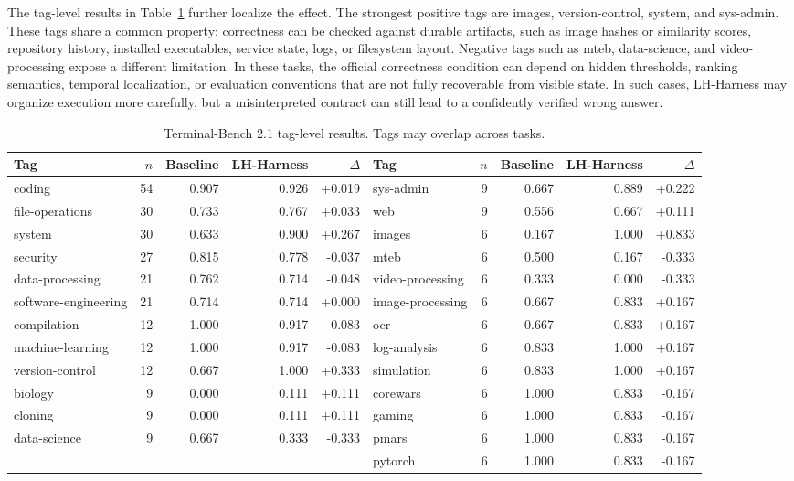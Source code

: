 The tag-level results in Table~\ref{tab:terminalbench-tag-breakdown} further localize the effect. The strongest positive tags are images, version-control, system, and sys-admin. These tags share a common property: correctness can be checked against durable artifacts, such as image hashes or similarity scores, repository history, installed executables, service state, logs, or filesystem layout. Negative tags such as mteb, data-science, and video-processing expose a different limitation. In these tasks, the official correctness condition can depend on hidden thresholds, ranking semantics, temporal localization, or evaluation conventions that are not fully recoverable from visible state. In such cases, LH-Harness may organize execution more carefully, but a misinterpreted contract can still lead to a confidently verified wrong answer.

\begin{table}[t]
\caption{Terminal-Bench 2.1 tag-level results. Tags may overlap across tasks.}
\label{tab:terminalbench-tag-breakdown}
\centering
\scriptsize
\setlength{\tabcolsep}{4pt}
\begin{tabular}{lrrrr@{\hspace{1.1em}}lrrrr}
\toprule
Tag & $n$ & Baseline & LH-Harness & $\Delta$ &
Tag & $n$ & Baseline & LH-Harness & $\Delta$ \\
\midrule
coding & 54 & 0.907 & 0.926 & +0.019 & sys-admin & 9 & 0.667 & 0.889 & +0.222 \\
file-operations & 30 & 0.733 & 0.767 & +0.033 & web & 9 & 0.556 & 0.667 & +0.111 \\
system & 30 & 0.633 & 0.900 & +0.267 & images & 6 & 0.167 & 1.000 & +0.833 \\
security & 27 & 0.815 & 0.778 & -0.037 & mteb & 6 & 0.500 & 0.167 & -0.333 \\
data-processing & 21 & 0.762 & 0.714 & -0.048 & video-processing & 6 & 0.333 & 0.000 & -0.333 \\
software-engineering & 21 & 0.714 & 0.714 & +0.000 & image-processing & 6 & 0.667 & 0.833 & +0.167 \\
compilation & 12 & 1.000 & 0.917 & -0.083 & ocr & 6 & 0.667 & 0.833 & +0.167 \\
machine-learning & 12 & 1.000 & 0.917 & -0.083 & log-analysis & 6 & 0.833 & 1.000 & +0.167 \\
version-control & 12 & 0.667 & 1.000 & +0.333 & simulation & 6 & 0.833 & 1.000 & +0.167 \\
biology & 9 & 0.000 & 0.111 & +0.111 & corewars & 6 & 1.000 & 0.833 & -0.167 \\
cloning & 9 & 0.000 & 0.111 & +0.111 & gaming & 6 & 1.000 & 0.833 & -0.167 \\
data-science & 9 & 0.667 & 0.333 & -0.333 & pmars & 6 & 1.000 & 0.833 & -0.167 \\
 & & & & & pytorch & 6 & 1.000 & 0.833 & -0.167 \\
\bottomrule
\end{tabular}
\end{table}




